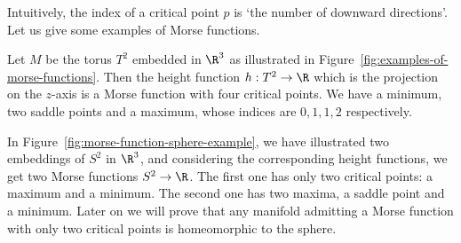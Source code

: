 Intuitively, the index of a critical point $p$ is `the number of downward directions'.
Let us give some examples of Morse functions.
\begin{marginfigure}
    \centering
    \caption{Example of a Morse function on the torus. At each critical point, the index $k$, the number of downward directions is indicated. }
    \label{fig:examples-of-morse-functions}
\end{marginfigure}
\begin{eg}
    Let $M$ be the torus  $T^2$ embedded in $\R^3$ as illustrated in Figure~\ref{fig:examples-of-morse-functions}.
    Then the height function $h: T^2 \to  \R$ which is the projection on the $z$-axis is a Morse function with four critical points.
    We have a minimum, two saddle points and a maximum, whose indices are $0, 1, 1, 2$ respectively.
\end{eg}


\begin{marginfigure}
    \centering
    \caption{Two Morse functions on $S^2$ with a different number of critical points.}
    \label{fig:morse-function-sphere-example}
\end{marginfigure}
\begin{eg}
    In Figure~\ref{fig:morse-function-sphere-example}, we have illustrated two embeddings of $S^2$ in $\R^3$, and considering the corresponding height functions, we get two Morse functions $S^2 \to  \R$.
    The first one has only two critical points: a maximum and a minimum.
    The second one has two maxima, a saddle point and a minimum.
    Later on we will prove that any manifold admitting a Morse function with only two critical points is homeomorphic to the sphere.
\end{eg}


